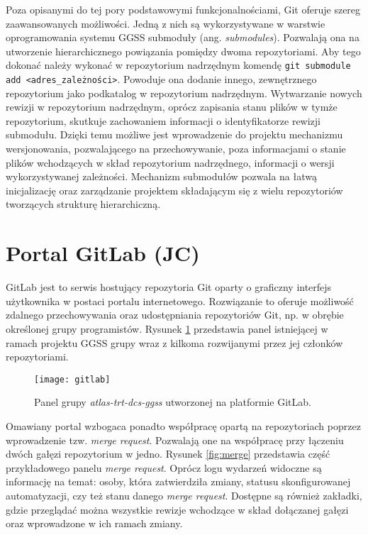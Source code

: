 Poza opisanymi do tej pory podstawowymi funkcjonalnościami, Git oferuje szereg zaawansowanych możliwości. Jedną z nich są wykorzystywane w warstwie oprogramowania systemu GGSS submoduły (ang. \emph{submodules}). Pozwalają ona na utworzenie hierarchicznego powiązania pomiędzy dwoma repozytoriami. Aby tego dokonać należy wykonać w repozytorium nadrzędnym komendę \lstinline{git submodule add <adres_zależności>}. Powoduje ona dodanie innego, zewnętrznego repozytorium jako podkatalog w repozytorium nadrzędnym. Wytwarzanie nowych rewizji w repozytorium nadrzędnym, oprócz zapisania stanu plików w tymże repozytorium, skutkuje zachowaniem informacji o identyfikatorze rewizji submodułu. Dzięki temu możliwe jest wprowadzenie do projektu mechanizmu wersjonowania, pozwalającego na przechowywanie, poza informacjami o stanie plików wchodzących w skład repozytorium nadrzędnego, informacji o wersji wykorzystywanej zależności. Mechanizm submodułów pozwala na łatwą inicjalizację oraz zarządzanie projektem składającym się z wielu repozytoriów tworzących strukturę hierarchiczną. 


\section{Portal GitLab (JC)}

GitLab jest to serwis hostujący repozytoria Git oparty o graficzny interfejs użytkownika w postaci portalu internetowego. Rozwiązanie to oferuje możliwość zdalnego przechowywania oraz udostępniania repozytoriów Git, np. w obrębie określonej grupy programistów. Rysunek \ref{fig:gitlab} przedstawia panel istniejącej w ramach projektu GGSS grupy wraz z kilkoma rozwijanymi przez jej członków repozytoriami.

\begin{figure}[H]
    \centering
    \texttt{[image: gitlab]}
    \caption{Panel grupy \emph{atlas-trt-dcs-ggss} utworzonej na platformie GitLab.}
    \label{fig:gitlab}
\end{figure}

Omawiany portal wzbogaca ponadto współpracę opartą na repozytoriach poprzez wprowadzenie tzw. \emph{merge request}. Pozwalają one na współpracę przy łączeniu dwóch gałęzi repozytorium w jedno. Rysunek \ref{fig:merge} przedstawia część przykładowego panelu \emph{merge request}. Oprócz logu wydarzeń widoczne są informację na temat: osoby, która zatwierdziła zmiany, statusu skonfigurowanej automatyzacji, czy też stanu danego \emph{merge request}. Dostępne są również zakładki, gdzie przeglądać można wszystkie rewizje wchodzące w skład dołączanej gałęzi oraz wprowadzone w ich ramach zmiany.

